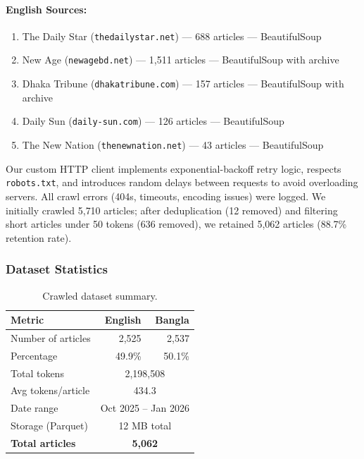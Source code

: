 \documentclass[12pt,a4paper]{article}
\begin{document}
\paragraph{English Sources:}
\begin{enumerate}
    \item The Daily Star (\texttt{thedailystar.net}) --- 688 articles --- BeautifulSoup
    \item New Age (\texttt{newagebd.net}) --- 1{,}511 articles --- BeautifulSoup with archive
    \item Dhaka Tribune (\texttt{dhakatribune.com}) --- 157 articles --- BeautifulSoup with archive
    \item Daily Sun (\texttt{daily-sun.com}) --- 126 articles --- BeautifulSoup
    \item The New Nation (\texttt{thenewnation.net}) --- 43 articles --- BeautifulSoup
\end{enumerate}

Our custom HTTP client implements exponential-backoff retry logic, respects \texttt{robots.txt}, and introduces random delays between requests to avoid overloading servers. All crawl errors (404s, timeouts, encoding issues) were logged. We initially crawled 5{,}710 articles; after deduplication (12 removed) and filtering short articles under 50 tokens (636 removed), we retained 5{,}062 articles (88.7\% retention rate).

\subsubsection{Dataset Statistics}

\begin{table}[H]
\centering
\caption{Crawled dataset summary.}
\label{tab:dataset}
\begin{tabular}{lrr}
\toprule
\textbf{Metric} & \textbf{English} & \textbf{Bangla} \\
\midrule
Number of articles      & 2{,}525  & 2{,}537  \\
Percentage              & 49.9\%   & 50.1\%   \\
Total tokens            & \multicolumn{2}{c}{2{,}198{,}508} \\
Avg tokens/article      & \multicolumn{2}{c}{434.3} \\
Date range              & \multicolumn{2}{c}{Oct 2025 -- Jan 2026} \\
Storage (Parquet)       & \multicolumn{2}{c}{12 MB total} \\
\textbf{Total articles} & \multicolumn{2}{c}{\textbf{5{,}062}} \\
\bottomrule
\end{tabular}
\end{table}
\end{document}
